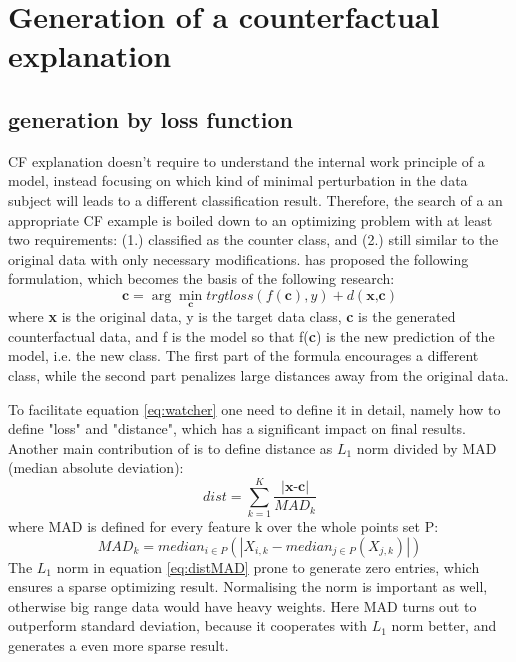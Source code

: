 \section{Generation of a counterfactual explanation}
\subsection{generation by loss function}
CF explanation doesn't require to understand the internal work principle of a model, instead focusing on which kind of minimal perturbation in the data subject will leads to a different classification result. Therefore, the search of a an appropriate CF example is boiled down to an optimizing problem with at least two requirements: (1.) classified as the counter class, and (2.) still similar to the original data with only necessary modifications. \cite{watcher2017} has proposed the following formulation, which becomes the basis of the following research:
\begin{equation}\label{eq:watcher}
  \textbf{c}=\arg\min_{\textbf{c}}trgtloss(f(\textbf{c}),y)+d(\textbf{x,c})
\end{equation}
where \textbf{x} is the original data, y is the target data class, \textbf{c} is the generated counterfactual data, and f is the model so that f(\textbf{c}) is the new prediction of the model, i.e. the new class. The first part of the formula encourages a different class, while the second part penalizes large distances away from the original data.

To facilitate equation \ref{eq:watcher} one need to define it in detail, namely how to define "loss" and "distance", which has a significant impact on final results. Another main contribution of \cite{watcher2017} is to define distance as \emph{$L_1$} norm divided by MAD (median absolute deviation):
\begin{equation}\label{eq:distOriginal}
  dist = \sum_{k=1}^{K}\frac{|\textbf{x-c}|}{MAD_k}
\end{equation}
where MAD is defined for every feature k over the whole points set P:
\begin{equation}\label{eq:MAD}
  MAD_k=median_{i\in P}(|{X_{i,k}}-median_{j\in P}(X_{j,k})|)
\end{equation}
The \emph{$L_1$} norm in equation \ref{eq:distMAD} prone to generate zero entries, which ensures a sparse optimizing result. Normalising the norm is important as well, otherwise big range data would have heavy weights. Here MAD turns out to outperform standard deviation, because it cooperates with \emph{$L_1$} norm better, and generates a even more sparse result.


